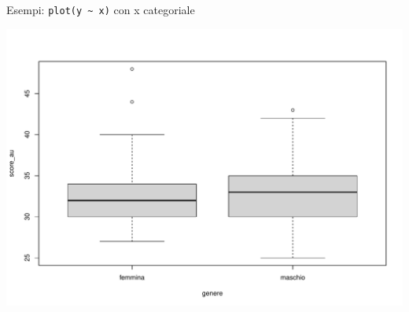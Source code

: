 \documentclass[
  ignorenonframetext,
]{beamer}
\newenvironment{Shaded}{\begin{snugshade}}{\end{snugshade}}
\newcommand{\AttributeTok}[1]{\textcolor[rgb]{0.00,0.34,0.68}{#1}}
\newcommand{\DecValTok}[1]{\textcolor[rgb]{0.69,0.50,0.00}{#1}}
\newcommand{\FunctionTok}[1]{\textcolor[rgb]{0.39,0.29,0.61}{#1}}
\newcommand{\NormalTok}[1]{\textcolor[rgb]{0.12,0.11,0.11}{#1}}
\newcommand{\OtherTok}[1]{\textcolor[rgb]{0.00,0.43,0.16}{#1}}
\newcommand{\SpecialCharTok}[1]{\textcolor[rgb]{0.24,0.68,0.91}{#1}}
\newcommand{\StringTok}[1]{\textcolor[rgb]{0.75,0.01,0.01}{#1}}
\begin{document}
\begin{frame}[fragile]{Esempi: \texttt{plot(y\ \textasciitilde{}\ x)}
con x categoriale}
\protect\hypertarget{esempi-ploty-x-con-x-categoriale}{}
\begin{Shaded}
\end{Shaded}

\begin{center}\includegraphics[width=0.7\linewidth]{Practice_files/figure-beamer/unnamed-chunk-42-1} \end{center}
\end{frame}
\end{document}
